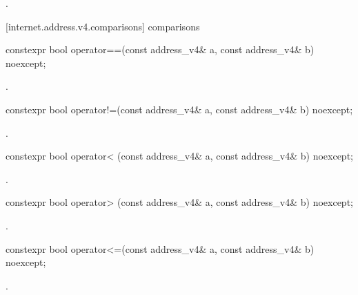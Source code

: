 \begin{itemdescr}
\pnum
\returns {}.
\end{itemdescr}



[internet.address.v4.comparisons]{ comparisons}

%
\begin{itemdecl}
constexpr bool operator==(const address_v4& a, const address_v4& b) noexcept;
\end{itemdecl}

\begin{itemdescr}
\pnum
\returns {}.
\end{itemdescr}

%
\begin{itemdecl}
constexpr bool operator!=(const address_v4& a, const address_v4& b) noexcept;
\end{itemdecl}

\begin{itemdescr}
\pnum
\returns {}.
\end{itemdescr}

%
\begin{itemdecl}
constexpr bool operator< (const address_v4& a, const address_v4& b) noexcept;
\end{itemdecl}

\begin{itemdescr}
\pnum
\returns {}.
\end{itemdescr}

%
\begin{itemdecl}
constexpr bool operator> (const address_v4& a, const address_v4& b) noexcept;
\end{itemdecl}

\begin{itemdescr}
\pnum
\returns {}.
\end{itemdescr}

%
\begin{itemdecl}
constexpr bool operator<=(const address_v4& a, const address_v4& b) noexcept;
\end{itemdecl}

\begin{itemdescr}
\pnum
\returns {}.
\end{itemdescr}

